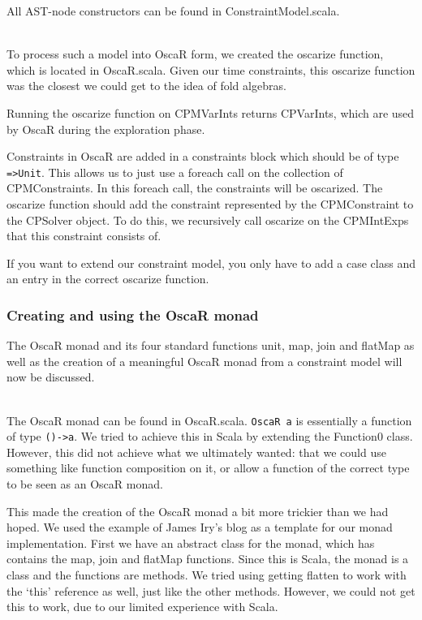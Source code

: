 \documentclass[a4paper]{article}
\begin{document}
All AST-node constructors can be found in ConstraintModel.scala.

\hspace*{1em}\\
To process such a model into OscaR form, 
we created the oscarize function, which is located in OscaR.scala.
Given our time constraints, 
this oscarize function was the closest we could get to the idea of fold algebras.

Running the oscarize function on CPMVarInts returns CPVarInts,
which are used by OscaR during the exploration phase.

Constraints in OscaR are added in a constraints block which should be of type
\verb|=>Unit|.
This allows us to just use a foreach call on the collection of CPMConstraints.
In this foreach call, the constraints will be oscarized.
The oscarize function should add the constraint represented by the CPMConstraint
to the CPSolver object.
To do this, we recursively call oscarize on the CPMIntExps
that this constraint consists of.

If you want to extend our constraint model,
you only have to add a case class and an entry in the correct oscarize function.


\subsubsection{Creating and using the OscaR monad}
The OscaR monad and its four standard functions unit, map, join and flatMap as well as
the creation of a meaningful OscaR monad from a constraint model will now
be discussed.

\hspace*{1em}\\
The OscaR monad can be found in OscaR.scala.
\verb|OscaR a| is essentially a function of type \verb|()->a|.
We tried to achieve this in Scala by extending the Function0 class.
However, this did not achieve what we ultimately wanted: 
that we could use something like function composition on it,
or allow a function of the correct type to be seen as an OscaR monad.

This made the creation of the OscaR monad a bit more trickier than we had hoped.
We used the example of James Iry's blog\cite{elephants} as a template for our
monad implementation.
First we have an abstract class for the monad, 
which has contains the map, join and flatMap functions.
Since this is Scala, the monad is a class and the functions are methods.
We tried using getting flatten to work with the `this' reference as well,
just like the other methods.
However, we could not get this to work, due to our limited experience with Scala.
\end{document}
